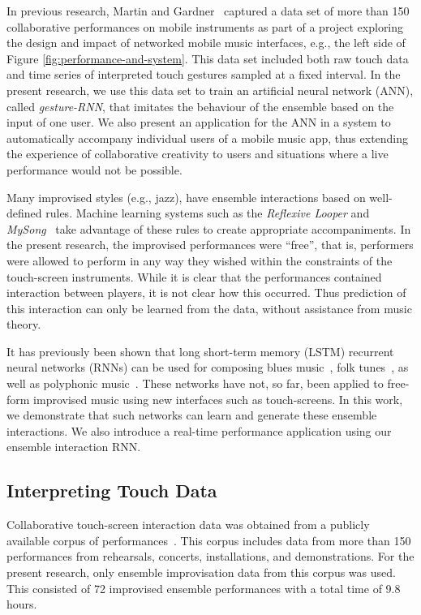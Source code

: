 \documentclass[sigchi, authorversion=true]{acmart}
\begin{document}
In previous research, Martin and Gardner~\cite{Martin:2016rm} captured a
data set of more than 150 collaborative performances on mobile
instruments as part of a project exploring the design and impact of
networked mobile music interfaces, e.g., the left side of Figure
\ref{fig:performance-and-system}. This data set included both raw
touch data and time series of interpreted touch gestures sampled at a
fixed interval. In the present research, we use this data set to train
an artificial neural network (ANN), called \emph{gesture-RNN}, that imitates the
behaviour of the ensemble based on the input of one user. We also
present an application for the ANN in a system to automatically
accompany individual users of a mobile music app, thus extending the
experience of collaborative creativity to users and situations where a
live performance would not be possible.

Many improvised styles (e.g., jazz), have ensemble interactions based
on well-defined rules. Machine learning systems such as the
\emph{Reflexive Looper}\cite{Pachet:2013kq} and
\emph{MySong}~\cite{Simon:2008dp} take advantage of these rules to
create appropriate accompaniments. In the present research, the
improvised performances were ``free'', that is, performers were
allowed to perform in any way they wished within the constraints of
the touch-screen instruments. While it is clear that the performances
contained interaction between players, it is not clear how this
occurred. Thus prediction of this interaction can only be learned from
the data, without assistance from music theory.

It has previously been shown that long short-term memory (LSTM)
recurrent neural networks (RNNs) can be used for composing blues
music~\cite{Eck:2007rw}, folk tunes~\cite{Sturm:2016rz}, as well as
polyphonic music~\cite{Walder:2016aa}. These networks have not, so
far, been applied to free-form improvised music using new interfaces
such as touch-screens. In this work, we demonstrate that such networks
can learn and generate these ensemble interactions. We also introduce
a real-time performance application using our ensemble interaction
RNN.

\subsection{Interpreting Touch Data}

Collaborative touch-screen interaction data was obtained from a
publicly available corpus of performances~\cite{Martin:2016fc}. This corpus includes data from more
than 150 performances from rehearsals, concerts, installations, and
demonstrations. For the present research, only ensemble improvisation
data from this corpus was used. This consisted of 72 improvised
ensemble performances with a total time of 9.8 hours.
\end{document}
